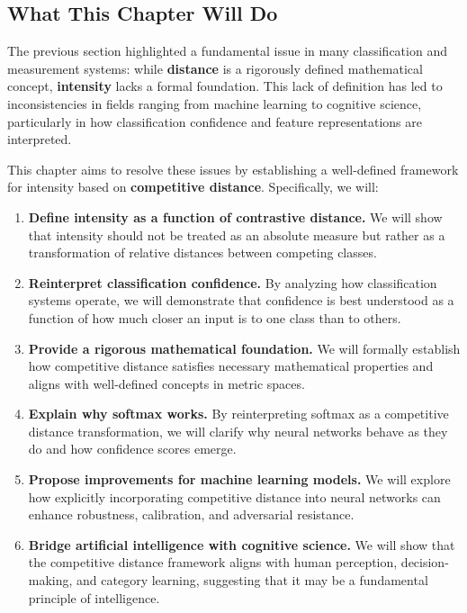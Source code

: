 \subsection{What This Chapter Will Do}

The previous section highlighted a fundamental issue in many classification and measurement systems: while \textbf{distance} is a rigorously defined mathematical concept, \textbf{intensity} lacks a formal foundation. This lack of definition has led to inconsistencies in fields ranging from machine learning to cognitive science, particularly in how classification confidence and feature representations are interpreted.

This chapter aims to resolve these issues by establishing a well-defined framework for intensity based on \textbf{competitive distance}. Specifically, we will:

\begin{enumerate}
    \item \textbf{Define intensity as a function of contrastive distance.} We will show that intensity should not be treated as an absolute measure but rather as a transformation of relative distances between competing classes.
    \item \textbf{Reinterpret classification confidence.} By analyzing how classification systems operate, we will demonstrate that confidence is best understood as a function of how much closer an input is to one class than to others.
    \item \textbf{Provide a rigorous mathematical foundation.} We will formally establish how competitive distance satisfies necessary mathematical properties and aligns with well-defined concepts in metric spaces.
    \item \textbf{Explain why softmax works.} By reinterpreting softmax as a competitive distance transformation, we will clarify why neural networks behave as they do and how confidence scores emerge.
    \item \textbf{Propose improvements for machine learning models.} We will explore how explicitly incorporating competitive distance into neural networks can enhance robustness, calibration, and adversarial resistance.
    \item \textbf{Bridge artificial intelligence with cognitive science.} We will show that the competitive distance framework aligns with human perception, decision-making, and category learning, suggesting that it may be a fundamental principle of intelligence.
\end{enumerate}

